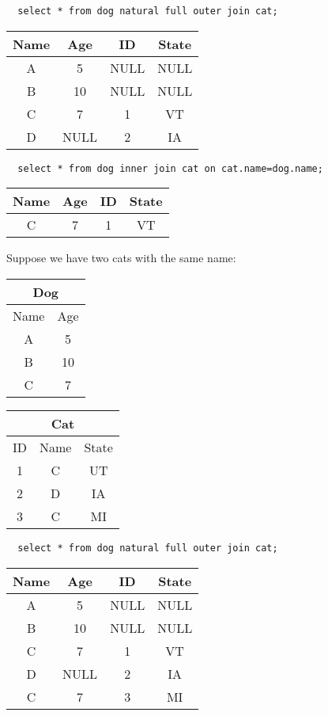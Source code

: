 \documentclass{math}
\begin{document}
\begin{lstlisting}
  select * from dog natural full outer join cat;
\end{lstlisting}
\begin{center}
  \begin{tabular}{|c|c|c|c|}
    \hline
    Name & Age & ID & State \\
    \hline
    A & 5 & NULL & NULL \\
    B & 10 & NULL & NULL \\
    C & 7 & 1 & VT \\
    D & NULL & 2 & IA \\
    \hline
  \end{tabular}
\end{center}
\begin{lstlisting}
  select * from dog inner join cat on cat.name=dog.name;
\end{lstlisting}
\begin{center}
  \begin{tabular}{|c|c|c|c|}
    \hline
    Name & Age & ID & State \\
    \hline
    C & 7 & 1 & VT \\
    \hline
  \end{tabular}
\end{center}
Suppose we have two cats with the same name:
\begin{center}
  \begin{tabular}{|c|c|}
    \hline
    \multicolumn{2}{|c|}{Dog} \\
    \hline
    Name & Age \\
    \hline
    A & 5 \\
    B & 10 \\
    C & 7 \\
    \hline
  \end{tabular}
  \begin{tabular}{|c|c|c|}
    \hline
    \multicolumn{3}{|c|}{Cat} \\
    \hline
    ID & Name & State \\
    \hline
    1 & C & UT \\
    2 & D & IA \\
    3 & C & MI \\
    \hline
  \end{tabular}
\end{center}
\begin{lstlisting}
  select * from dog natural full outer join cat;
\end{lstlisting}
\begin{center}
  \begin{tabular}{|c|c|c|c|}
    \hline
    Name & Age & ID & State \\
    \hline
    A & 5 & NULL & NULL \\
    B & 10 & NULL & NULL \\
    C & 7 & 1 & VT \\
    D & NULL & 2 & IA \\
    C & 7 & 3 & MI \\
    \hline
  \end{tabular}
\end{center}
\end{document}
